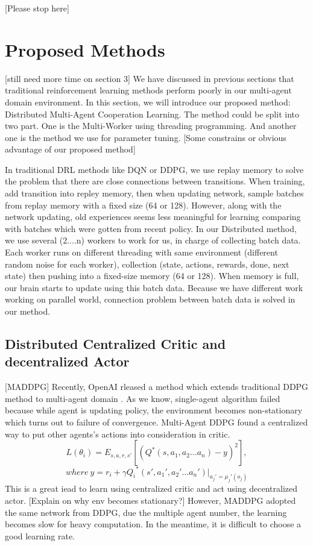 \documentclass[11pt,twocolumn]{jarticle} %
\begin{document}
[Please stop here]
\section{Proposed Methods}[still need more time on section 3]
We have discussed in previous sections that traditional reinforcement learning methods perform poorly in our multi-agent domain environment. In this section, we will introduce our proposed method: Distributed Multi-Agent Cooperation Learning. The method could be split into two part. One is the Multi-Worker using threading programming. And another one is the method we use for parameter tuning.
[Some constrains or obvious advantage of our proposed method]

In traditional DRL methods like DQN or DDPG, we use replay memory to solve the problem that there are close connections between transitions. When training, add transition into repley memory, then when updating network, sample batches from replay memory with a fixed size (64 or 128). However, along with the network updating, old experiences seems less meaningful for learning comparing with batches which were gotten from recent policy. 
In our Distributed method, we use several (2....n) workers to work for us, in charge of collecting batch data. Each worker runs on different threading with same environment (different random noise for each worker), collection (state, actions, rewards, done, next state) then pushing into a fixed-size memory (64 or 128). When memory is full, our brain starts to update using this batch data. Because we have different work working on parallel world, connection problem between batch data is solved in our method.  

\subsection{Distributed Centralized Critic and decentralized Actor}
[MADDPG]
Recently, OpenAI rleased a method which extends traditional DDPG method to multi-agent domain \cite{4}. As we know, single-agent algorithm failed because while agent is updating policy, the environment becomes non-stationary which turns out to failure of convergence. Multi-Agent DDPG found a centralized way to put other agents's actions into consideration in critic.
\begin{equation}
L(\theta_i) = E_{s,a,r,s'}[(Q^*(s, a_1, a_2 ... a_n) - y)^2],  
\end{equation}
$$where\ y = r_i + \gamma{Q_i}^*(s', a_1', a_2' ... a_n') | _{a_j'=\mu_j'(o_j)}$$
This is a great iead to learn using centralized critic and act using decentralized actor. 
[Explain on why env becomes stationary?]
However, MADDPG adopted the same network from DDPG, due the multiple agent number, the learning becomes slow for heavy computation. In the meantime, it is difficult to choose a good learning rate.
\end{document}
